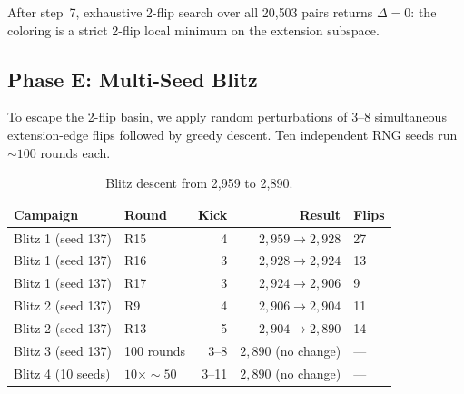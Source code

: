\documentclass[11pt,a4paper]{article}
\theoremstyle{plain}
\theoremstyle{remark}
\begin{document}
After step~7, exhaustive 2-flip search over all 20{,}503 pairs
returns $\Delta = 0$: the coloring is a strict 2-flip local minimum
on the extension subspace.

\subsection{Phase E: Multi-Seed Blitz}

To escape the 2-flip basin, we apply random perturbations of
3--8 simultaneous extension-edge flips followed by greedy descent.
Ten independent RNG seeds run ${\sim}100$ rounds each.

\begin{table}[H]
\centering
\caption{Blitz descent from 2{,}959 to 2{,}890.}
\label{tab:blitz}
\small
\begin{tabular}{@{}llrrl@{}}
\toprule
\textbf{Campaign} & \textbf{Round} & \textbf{Kick} & \textbf{Result} & \textbf{Flips} \\
\midrule
Blitz 1 (seed 137) & R15 & 4 & $2{,}959 \to 2{,}928$ & 27 \\
Blitz 1 (seed 137) & R16 & 3 & $2{,}928 \to 2{,}924$ & 13 \\
Blitz 1 (seed 137) & R17 & 3 & $2{,}924 \to 2{,}906$ & 9 \\
Blitz 2 (seed 137) & R9  & 4 & $2{,}906 \to 2{,}904$ & 11 \\
Blitz 2 (seed 137) & R13 & 5 & $2{,}904 \to 2{,}890$ & 14 \\
\midrule
Blitz 3 (seed 137) & 100 rounds & 3--8 & $2{,}890$ (no change) & --- \\
Blitz 4 (10 seeds) & $10 \times {\sim}50$ & 3--11 & $2{,}890$ (no change) & --- \\
\bottomrule
\end{tabular}
\end{table}
\end{document}
